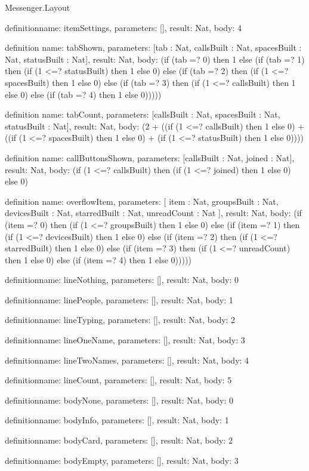 \begin{lexlean}{Messenger.Layout}
\begin{semanticmodule}
definition{name: itemSettings, parameters: [], result: Nat, body: 4}

definition{
  name: tabShown,
  parameters: [tab : Nat, callsBuilt : Nat, spacesBuilt : Nat, statusBuilt : Nat],
  result: Nat,
  body: (if (tab =? 0) then 1 else (if (tab =? 1) then (if (1 <=? statusBuilt) then 1 else 0) else (if (tab =? 2) then (if (1 <=? spacesBuilt) then 1 else 0) else (if (tab =? 3) then (if (1 <=? callsBuilt) then 1 else 0) else (if (tab =? 4) then 1 else 0)))))
}

definition{
  name: tabCount,
  parameters: [callsBuilt : Nat, spacesBuilt : Nat, statusBuilt : Nat],
  result: Nat,
  body: (2 + ((if (1 <=? callsBuilt) then 1 else 0) + ((if (1 <=? spacesBuilt) then 1 else 0) + (if (1 <=? statusBuilt) then 1 else 0))))
}

definition{
  name: callButtonsShown,
  parameters: [callsBuilt : Nat, joined : Nat],
  result: Nat,
  body: (if (1 <=? callsBuilt) then (if (1 <=? joined) then 1 else 0) else 0)
}

definition{
  name: overflowItem,
  parameters: [
    item : Nat,
    groupsBuilt : Nat,
    devicesBuilt : Nat,
    starredBuilt : Nat,
    unreadCount : Nat
  ],
  result: Nat,
  body: (if (item =? 0) then (if (1 <=? groupsBuilt) then 1 else 0) else (if (item =? 1) then (if (1 <=? devicesBuilt) then 1 else 0) else (if (item =? 2) then (if (1 <=? starredBuilt) then 1 else 0) else (if (item =? 3) then (if (1 <=? unreadCount) then 1 else 0) else (if (item =? 4) then 1 else 0)))))
}

definition{name: lineNothing, parameters: [], result: Nat, body: 0}

definition{name: linePeople, parameters: [], result: Nat, body: 1}

definition{name: lineTyping, parameters: [], result: Nat, body: 2}

definition{name: lineOneName, parameters: [], result: Nat, body: 3}

definition{name: lineTwoNames, parameters: [], result: Nat, body: 4}

definition{name: lineCount, parameters: [], result: Nat, body: 5}

definition{name: bodyNone, parameters: [], result: Nat, body: 0}

definition{name: bodyInfo, parameters: [], result: Nat, body: 1}

definition{name: bodyCard, parameters: [], result: Nat, body: 2}

definition{name: bodyEmpty, parameters: [], result: Nat, body: 3}


\end{semanticmodule}
\end{lexlean}
